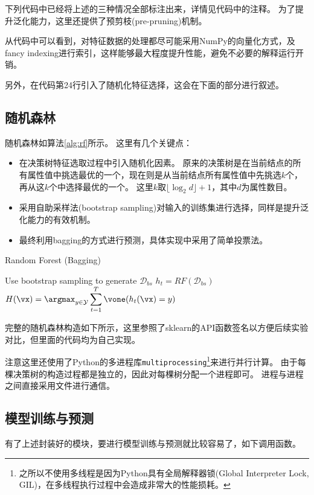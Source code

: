 \documentclass[logo,reportComp]{thesis}
\begin{document}
下列代码中已经将上述的三种情况全部标注出来，详情见代码中的注释。
为了提升泛化能力，这里还提供了预剪枝(pre-pruning)机制。


从代码中可以看到，对特征数据的处理都尽可能采用NumPy的向量化方式，及fancy indexing进行索引，这样能够最大程度提升性能，避免不必要的解释运行开销。

另外，在代码第24行引入了随机化特征选择，这会在下面的部分进行叙述。

\subsection{随机森林}
随机森林如算法\ref{alg:rf}所示。
这里有几个关键点：
\begin{itemize}
	\item 在决策树特征选取过程中引入随机化因素。
	原来的决策树是在当前结点的所有属性值中挑选最优的一个，现在则是从当前结点所有属性值中先挑选$k$个，再从这$k$个中选择最优的一个。
	这里$k$取$\lfloor\log_2 d\rfloor+1$，其中$d$为属性数目。
	\item 采用自助采样法(bootstrap sampling)对输入的训练集进行选择，同样是提升泛化能力的有效机制。
	\item 最终利用bagging的方式进行预测，具体实现中采用了简单投票法。
\end{itemize}
\begin{algorithm}
\caption{Random Forest (Bagging)}
\label{alg:rf}
\begin{algorithmic}[1]
\State Use bootstrap sampling to generate $\mathcal{D}_{bs}$
\State $h_t=RF(\mathcal{D}_{bs})$
\EndFor
\State \Return $\displaystyle H(\vx)=\argmax_{y\in\mathcal{Y}}\sum_{t=1}^T\vone(h_t(\vx)=y)$
\end{algorithmic}
\end{algorithm}

完整的随机森林构造如下所示，这里参照了sklearn的API函数签名以方便后续实验对比，但里面的代码均为自己实现。


注意这里还使用了Python的多进程库\verb'multiprocessing'\footnote{之所以不使用多线程是因为Python具有全局解释器锁(Global Interpreter Lock, GIL)，在多线程执行过程中会造成非常大的性能损耗。}来进行并行计算。
由于每棵决策树的构造过程都是独立的，因此对每棵树分配一个进程即可。
进程与进程之间直接采用文件进行通信。

\subsection{模型训练与预测}
有了上述封装好的模块，要进行模型训练与预测就比较容易了，如下调用函数。

\end{document}
